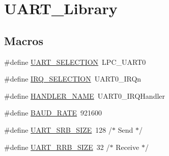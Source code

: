 \hypertarget{group___u_a_r_t___library}{}\section{U\+A\+R\+T\+\_\+\+Library}
\label{group___u_a_r_t___library}
\subsection*{Macros}
\begin{DoxyCompactItemize}
\item 
\#define \hyperlink{group___u_a_r_t___library_ga43200fe4a9ea07a8a7f41b484fce9a18}{U\+A\+R\+T\+\_\+\+S\+E\+L\+E\+C\+T\+I\+O\+N}~L\+P\+C\+\_\+\+U\+A\+R\+T0
\item 
\#define \hyperlink{group___u_a_r_t___library_ga7c3d3b9d5cf2685f7fdb298eaf359875}{I\+R\+Q\+\_\+\+S\+E\+L\+E\+C\+T\+I\+O\+N}~U\+A\+R\+T0\+\_\+\+I\+R\+Qn
\item 
\#define \hyperlink{group___u_a_r_t___library_gafa87a27ed6f715eb90d4db80687e93bf}{H\+A\+N\+D\+L\+E\+R\+\_\+\+N\+A\+M\+E}~U\+A\+R\+T0\+\_\+\+I\+R\+Q\+Handler
\item 
\#define \hyperlink{group___u_a_r_t___library_gad4455691936f92fdd6c37566fc58ba1f}{B\+A\+U\+D\+\_\+\+R\+A\+T\+E}~921600
\item 
\#define \hyperlink{group___u_a_r_t___library_ga5fe77d3c1b35665239feac7a45b514a6}{U\+A\+R\+T\+\_\+\+S\+R\+B\+\_\+\+S\+I\+Z\+E}~128	/$\ast$ Send $\ast$/
\item 
\#define \hyperlink{group___u_a_r_t___library_gaf9c71990720971fa35b971b5e305c05b}{U\+A\+R\+T\+\_\+\+R\+R\+B\+\_\+\+S\+I\+Z\+E}~32	/$\ast$ Receive $\ast$/
\end{DoxyCompactItemize}
